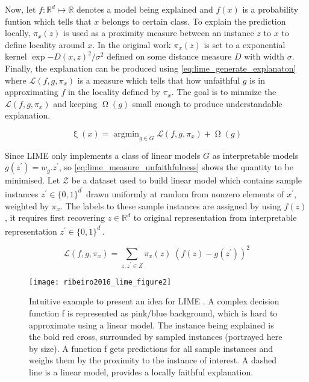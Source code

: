 \documentclass[english]{tktltiki2}
\theoremstyle{definition}
\theoremstyle{remark}
\newcommand{\onespace}{\;}
\DeclareMathOperator*{\argmin}{argmin}
\begin{document}
Now, let $f: \mathbb{R}^d \mapsto \mathbb{R}$ denotes a model being explained and $f(x)$ is a probability funtion which tells that $x$ belongs to certain class. To explain the prediction locally, $\pi_x(z)$ is used as a proximity measure between an instance $z$ to $x$ to define locality around $x$. In the original work \citep{ribeiro2016should} $\pi_x(z)$ is set to a exponential kernel $\exp{-D(x,z)^2/\sigma^2}$ defined on some distance measure $D$ with width $\sigma$.
Finally, the explanation can be produced using \eqref{eq:lime_generate_explanaton} where $\mathcal{L}(f, g, \pi_x)$ is a measure which tells that how unfaithful $g$ is in approximating $f$ in the locality defined by $\pi_x$. The goal is to minmize the $\mathcal{L}(f, g, \pi_x)$ and keeping $\upOmega(g)$ small enough to produce understandable explanation.

\begin{equation}\label{eq:lime_generate_explanaton}
\mathsf{\upxi}(x) = \argmin_{g \in G} \mathcal{L}(f, g, \pi_x) + \upOmega(g)
\end{equation}

Since LIME \citep{ribeiro2016should} only implements a class of linear models $G$ as interpretable models $g(z^\prime)=w_g.z^\prime$, so \eqref{eq:lime_measure_unfaithfulness} shows the quantity to be minimised. Let $\mathcal{Z}$ be a dataset used to build linear model which contains sample instances $z^\prime \in \{0, 1\}^{d^\prime}$ drawn uniformly at random from nonzero elements of $x^\prime$, weighted by $\pi_x$. The labels to these sample instances are assigned by using $f(z)$, it requires first recovering $z \in \mathbb{R}^d$ to original representation from interpretable representation  $z^\prime \in \{0, 1\}^{d^\prime}$. 

\begin{equation}\label{eq:lime_measure_unfaithfulness}
\mathcal{L}(f, g, \pi_x) = \sum_{z, z^\prime \in Z} \pi_x(z)\onespace(f(z) - g(z^\prime))^2
\end{equation}

\begin{wrapfigure}{r}{0.6\textwidth}
	\centering
	\vspace*{-5mm}
	\texttt{[image: ribeiro2016\_lime\_figure2]}
	\vspace*{-10mm}
	\caption{Intuitive example to present an idea for LIME  \citep{ribeiro2016should}. A complex decision function f is represented as pink/blue background, which is hard to approximate using a linear model. The instance being explained is the bold red cross, surrounded by sampled instances (portrayed here by size). A function f gets predictions for all sample instances and weighs them by the proximity to the instance of interest. A dashed line is a linear model, provides a locally faithful explanation. }
	\label{fig:ribeiro2016_lime_figure2}
\end{wrapfigure}
\end{document}
